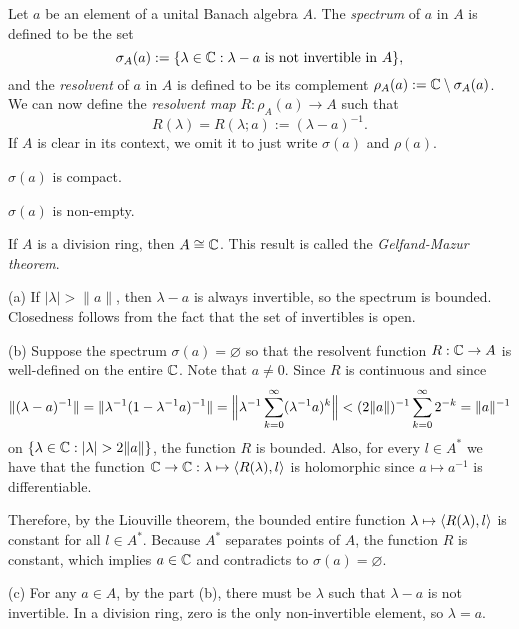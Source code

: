 \documentclass{../../large}
\begin{document}
\begin{prb}
Let $a$ be an element of a unital Banach algebra $A$.
The \emph{spectrum} of $a$ in $A$ is defined to be the set
\[\sigma_A(a):=\{\lambda\in\mathbb{C}:\lambda-a\text{ is not invertible in }A\},\]
and the \emph{resolvent} of $a$ in $A$ is defined to be its complement $\rho_A(a):=\mathbb{C}\setminus\sigma_A(a)$.
We can now define the \emph{resolvent map} $R:\rho_A(a)\to A$ such that
\[R(\lambda)=R(\lambda;a):=(\lambda-a)^{-1}.\]
If $A$ is clear in its context, we omit it to just write $\sigma(a)$ and $\rho(a)$.
\begin{parts}
\item $\sigma(a)$ is compact.
\item $\sigma(a)$ is non-empty.
\item If $A$ is a division ring, then $A\cong\mathbb{C}$. This result is called the \emph{Gelfand-Mazur theorem}.
\end{parts}
\end{prb}
\begin{pf}
(a)
If $|\lambda|>\|a\|$, then $\lambda-a$ is always invertible, so the spectrum is bounded.
Closedness follows from the fact that the set of invertibles is open.

(b)
Suppose the spectrum $\sigma(a)=\varnothing$ so that the resolvent function $R:\mathbb{C}\to A$ is well-defined on the entire $\mathbb{C}$.
Note that $a\ne0$.
Since $R$ is continuous and since
\[\|(\lambda-a)^{-1}\|=\|\lambda^{-1}(1-\lambda^{-1}a)^{-1}\|
=\Bigl\|\lambda^{-1}\sum_{k=0}^\infty(\lambda^{-1}a)^k\Bigr\|
<(2\|a\|)^{-1}\sum_{k=0}^\infty2^{-k}=\|a\|^{-1}\]
on $\{\lambda\in\C:|\lambda|>2\|a\|\}$, the function $R$ is bounded.
Also, for every $l\in A^*$ we have that the function $\mathbb{C}\to\mathbb{C}:\lambda\mapsto\langle R(\lambda),l\rangle$ is holomorphic since $a\mapsto a^{-1}$ is differentiable.

Therefore, by the Liouville theorem, the bounded entire function $\lambda\mapsto\langle R(\lambda),l\rangle$ is constant for all $l\in A^*$.
Because $A^*$ separates points of $A$, the function $R$ is constant, which implies $a\in\mathbb{C}$ and contradicts to $\sigma(a)=\varnothing$.

(c)
For any $a\in A$, by the part (b), there must be $\lambda$ such that $\lambda-a$ is not invertible.
In a division ring, zero is the only non-invertible element, so $\lambda=a$.
\end{pf}
\end{document}
